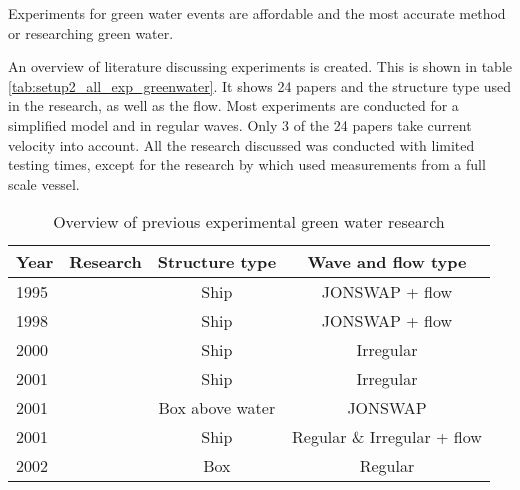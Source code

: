 Experiments for green water events are affordable and the most accurate method or researching green water.  \par
An overview of literature discussing experiments is created. This is shown in table \ref{tab:setup2_all_exp_greenwater}. It shows 24 papers and the structure type used in the research, as well as the flow. Most experiments are conducted for a simplified model and in regular waves. Only 3 of the 24 papers take current velocity into account. All the research discussed was conducted with limited testing times, except for the research by \citet{Hamoudi1998} which used measurements from a full scale vessel. \par 
\begin{table}[]
	\caption{Overview of previous experimental green water research}
	\begin{tabular}{ll|cc}
		\multicolumn{1}{l}{\textbf{Year}}      & \multicolumn{1}{l|}{\textbf{Research}}  & \multicolumn{1}{c}{\textbf{Structure type}} & \multicolumn{1}{c}{\textbf{Wave and flow type}}  \\ \hline 
		1995                                   &  \citet{Buchner1995}                            & Ship                                        & JONSWAP + flow                                 \\
		1998                                   & \citet{Hamoudi1998}                             & Ship                                        & JONSWAP + flow                                \\
		2000                                   & \citet{Ersdal2000}                             & Ship                                        & Irregular                            \\
		2001                                   & \citet{Stansberg2001}                           & Ship                                        & Irregular                              \\
		2001                                   & \citet{Cox2001}                               & Box above water                                        & JONSWAP                                \\
		2001                                   & \citet{Ogawa2001}                               & Ship                                        & Regular \& Irregular + flow                  \\
		2002                                   & \citet{Faltinsen2002}                         & Box                                         & Regular                               \\

\end{tabular}
\end{table}
